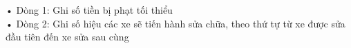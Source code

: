 • Dòng 1: Ghi số tiền bị phạt tối thiểu
\\• Dòng 2: Ghi số hiệu các xe sẽ tiến hành sửa chữa, theo thứ tự từ xe được sửa đầu tiên đến xe sửa sau cùng
